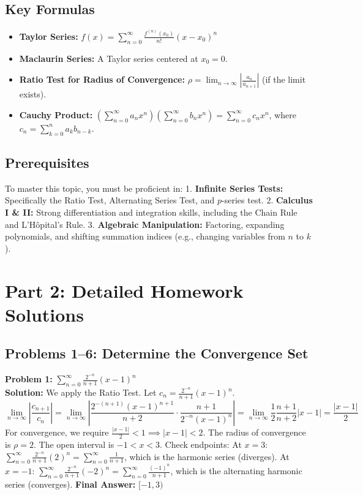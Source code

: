 \documentclass[11pt, letterpaper]{article}
\theoremstyle{definition}
\theoremstyle{remark}
\begin{document}
\subsection{Key Formulas}
\begin{itemize}
    \item \textbf{Taylor Series:} $f(x) = \sum_{n=0}^{\infty} \frac{f^{(n)}(x_0)}{n!} (x - x_0)^n$
    \item \textbf{Maclaurin Series:} A Taylor series centered at $x_0 = 0$.
    \item \textbf{Ratio Test for Radius of Convergence:} $\rho = \lim_{n \to \infty} \left| \frac{a_n}{a_{n+1}} \right|$ (if the limit exists).
    \item \textbf{Cauchy Product:} $\left(\sum_{n=0}^{\infty} a_n x^n\right) \left(\sum_{n=0}^{\infty} b_n x^n\right) = \sum_{n=0}^{\infty} c_n x^n$, where $c_n = \sum_{k=0}^{n} a_k b_{n-k}$.
\end{itemize}

\subsection{Prerequisites}
To master this topic, you must be proficient in:
1. \textbf{Infinite Series Tests:} Specifically the Ratio Test, Alternating Series Test, and $p$-series test.
2. \textbf{Calculus I \& II:} Strong differentiation and integration skills, including the Chain Rule and L'H\^{o}pital's Rule.
3. \textbf{Algebraic Manipulation:} Factoring, expanding polynomials, and shifting summation indices (e.g., changing variables from $n$ to $k$).

\newpage
\section{Part 2: Detailed Homework Solutions}

\subsection{Problems 1--6: Determine the Convergence Set}

\textbf{Problem 1:} $\displaystyle \sum_{n=0}^{\infty} \frac{2^{-n}}{n+1} (x-1)^n$
\\[6pt]
\textbf{Solution:} We apply the Ratio Test. Let $c_n = \frac{2^{-n}}{n+1} (x-1)^n$.
\[ \lim_{n \to \infty} \left| \frac{c_{n+1}}{c_n} \right| = \lim_{n \to \infty} \left| \frac{2^{-(n+1)}(x-1)^{n+1}}{n+2} \cdot \frac{n+1}{2^{-n}(x-1)^n} \right| = \lim_{n \to \infty} \frac{1}{2} \frac{n+1}{n+2} |x-1| = \frac{|x-1|}{2} \]
For convergence, we require $\frac{|x-1|}{2} < 1 \implies |x-1| < 2$. The radius of convergence is $\rho = 2$. The open interval is $-1 < x < 3$.
Check endpoints:
At $x = 3$: $\sum_{n=0}^{\infty} \frac{2^{-n}}{n+1} (2)^n = \sum_{n=0}^{\infty} \frac{1}{n+1}$, which is the harmonic series (diverges).
At $x = -1$: $\sum_{n=0}^{\infty} \frac{2^{-n}}{n+1} (-2)^n = \sum_{n=0}^{\infty} \frac{(-1)^n}{n+1}$, which is the alternating harmonic series (converges).
\textbf{Final Answer:} $[-1, 3)$
\end{document}
